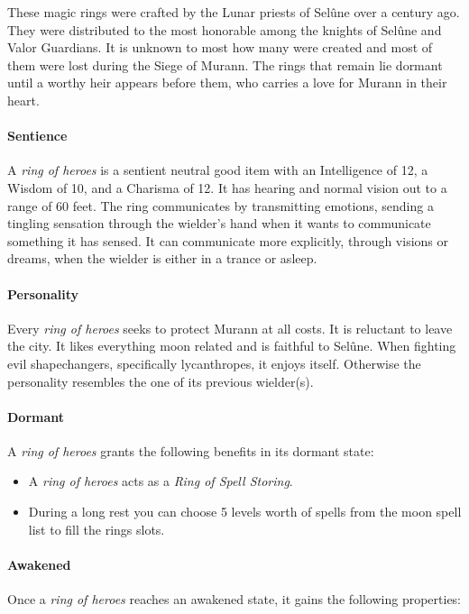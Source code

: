 \documentclass[letter,10pt,twocolumn,openany]{dndbook}
\begin{document}


These magic rings were crafted by the Lunar priests of Selûne over a century ago.
They were distributed to the most honorable among the knights of Selûne and Valor Guardians.
It is unknown to most how many were created and most of them were lost during the Siege of Murann.
The rings that remain lie dormant until a worthy heir appears before them, who carries a love for Murann in their heart.

\paragraph{Sentience}
A \textit{ring of heroes} is a sentient neutral good item with an Intelligence of 12, a Wisdom of 10, and a Charisma of 12.
It has hearing and normal vision out to a range of 60 feet.
The ring communicates by transmitting emotions, sending a tingling sensation through the wielder's hand when it wants to communicate something it has sensed.
It can communicate more explicitly, through visions or dreams, when the wielder is either in a trance or asleep.

\paragraph{Personality}
Every \textit{ring of heroes} seeks to protect Murann at all costs.
It is reluctant to leave the city.
It likes everything moon related and is faithful to Selûne.
When fighting evil shapechangers, specifically lycanthropes, it enjoys itself.
Otherwise the personality resembles the one of its previous wielder(s).

\paragraph{Dormant}
A \textit{ring of heroes} grants the following benefits in its dormant state:
\begin{itemize}
    \item A \textit{ring of heroes} acts as a \textit{Ring of Spell Storing}.
    \item During a long rest you can choose 5 levels worth of spells from the moon spell list to fill the rings slots.
\end{itemize}

\paragraph{Awakened}
Once a \textit{ring of heroes} reaches an awakened state, it gains the following properties:
\end{document}
